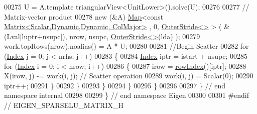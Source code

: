 \begin{DoxyCode}
00275         U = A.template triangularView<UnitLower>().solve(U); 
00276         
00277         \textcolor{comment}{// Matrix-vector product }
00278         \textcolor{keyword}{new} (&A) \hyperlink{group___core___module_class_eigen_1_1_map}{Map}<\textcolor{keyword}{const} \hyperlink{group___core___module_class_eigen_1_1_matrix}{Matrix<Scalar,Dynamic,Dynamic, ColMajor>}
      , 0, \hyperlink{class_eigen_1_1_outer_stride}{OuterStride<>} > ( &(Lval[luptr+nsupc]), nrow, nsupc, 
      \hyperlink{class_eigen_1_1_outer_stride}{OuterStride<>}(lda) );
00279         work.topRows(nrow).noalias() = A * U;
00280         
00281         \textcolor{comment}{//Begin Scatter }
00282         \textcolor{keywordflow}{for} (\hyperlink{namespace_eigen_a62e77e0933482dafde8fe197d9a2cfde}{Index} j = 0; j < nrhs; j++)
00283         \{
00284           \hyperlink{namespace_eigen_a62e77e0933482dafde8fe197d9a2cfde}{Index} iptr = istart + nsupc; 
00285           \textcolor{keywordflow}{for} (\hyperlink{namespace_eigen_a62e77e0933482dafde8fe197d9a2cfde}{Index} i = 0; i < nrow; i++)
00286           \{
00287             irow = \hyperlink{group___sparse_l_u___module_a8e6b4f399aa468a10e58db627d43a12a}{rowIndex}()[iptr]; 
00288             X(irow, j) -= work(i, j); \textcolor{comment}{// Scatter operation}
00289             work(i, j) = Scalar(0); 
00290             iptr++;
00291           \}
00292         \}
00293       \}
00294     \} 
00295 \}
00296 
00297 \} \textcolor{comment}{// end namespace internal}
00298 
00299 \} \textcolor{comment}{// end namespace Eigen}
00300 
00301 \textcolor{preprocessor}{#endif // EIGEN\_SPARSELU\_MATRIX\_H}
\end{DoxyCode}
